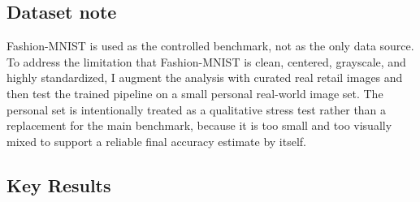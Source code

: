 \documentclass[11pt]{article}
\begin{document}
\subsection{Dataset note}\label{dataset-note}

Fashion-MNIST is used as the controlled benchmark, not as the only data
source. To address the limitation that Fashion-MNIST is clean, centered,
grayscale, and highly standardized, I augment the analysis with curated
real retail images and then test the trained pipeline on a small
personal real-world image set. The personal set is intentionally treated
as a qualitative stress test rather than a replacement for the main
benchmark, because it is too small and too visually mixed to support a
reliable final accuracy estimate by itself.

\subsection{Key Results}\label{key-results}
\end{document}
